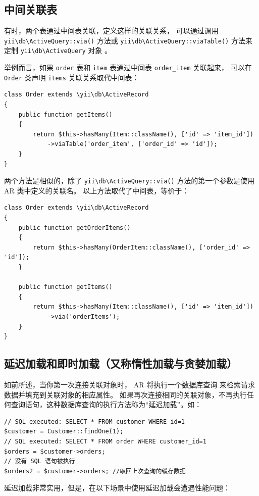 \subsection{中间关联表}
有时，两个表通过中间表关联，定义这样的关联关系， 可以通过调用 \texttt{yii{\allowbreak{}\textbackslash}db{\allowbreak{}\textbackslash}ActiveQuery\allowbreak{}::\allowbreak{}via()} 方法或 \texttt{yii{\allowbreak{}\textbackslash}db{\allowbreak{}\textbackslash}ActiveQuery\allowbreak{}::\allowbreak{}viaTable()} 方法来定制 \texttt{yii{\allowbreak{}\textbackslash}db{\allowbreak{}\textbackslash}ActiveQuery} 对象 。

举例而言，如果 \lstinline|order| 表和 \lstinline|item| 表通过中间表 \lstinline|order_item| 关联起来， 可以在 \lstinline|Order| 类声明 \lstinline|items| 关联关系取代中间表：

\lstset{language=php}\begin{lstlisting}
class Order extends \yii\db\ActiveRecord
{
    public function getItems()
    {
        return $this->hasMany(Item::className(), ['id' => 'item_id'])
            ->viaTable('order_item', ['order_id' => 'id']);
    }
}
\end{lstlisting}
两个方法是相似的，除了 \texttt{yii{\allowbreak{}\textbackslash}db{\allowbreak{}\textbackslash}ActiveQuery\allowbreak{}::\allowbreak{}via()} 方法的第一个参数是使用 AR 类中定义的关联名。 以上方法取代了中间表，等价于：

\lstset{language=php}\begin{lstlisting}
class Order extends \yii\db\ActiveRecord
{
    public function getOrderItems()
    {
        return $this->hasMany(OrderItem::className(), ['order_id' => 'id']);
    }

    public function getItems()
    {
        return $this->hasMany(Item::className(), ['id' => 'item_id'])
            ->via('orderItems');
    }
}
\end{lstlisting}
\subsection{延迟加载和即时加载（又称惰性加载与贪婪加载）}
如前所述，当你第一次连接关联对象时， AR 将执行一个数据库查询 来检索请求数据并填充到关联对象的相应属性。 如果再次连接相同的关联对象，不再执行任何查询语句，这种数据库查询的执行方法称为“延迟加载”。如：

\lstset{language=php}\begin{lstlisting}
// SQL executed: SELECT * FROM customer WHERE id=1
$customer = Customer::findOne(1);
// SQL executed: SELECT * FROM order WHERE customer_id=1
$orders = $customer->orders;
// 没有 SQL 语句被执行
$orders2 = $customer->orders; //取回上次查询的缓存数据
\end{lstlisting}
延迟加载非常实用，但是，在以下场景中使用延迟加载会遭遇性能问题：

